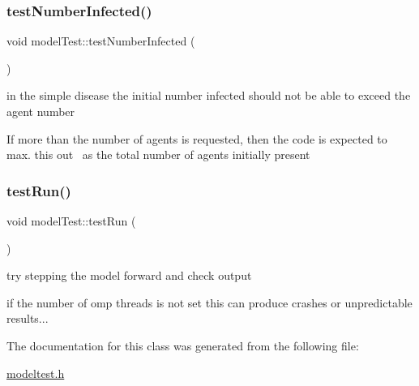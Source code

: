 \subsubsection{\texorpdfstring{test\+Number\+Infected()}{testNumberInfected()}}
{\footnotesize\ttfamily void model\+Test\+::test\+Number\+Infected (\begin{DoxyParamCaption}{ }\end{DoxyParamCaption})\hspace{0.3cm}{\ttfamily [inline]}}



in the simple disease the initial number infected should not be able to exceed the agent number 

If more than the number of agents is requested, then the code is expected to max. this out~\newline
as the total number of agents initially present \mbox{\label{classmodelTest_a18ccf91ea0223e52d439fa267665d718}} 
\subsubsection{\texorpdfstring{test\+Run()}{testRun()}}
{\footnotesize\ttfamily void model\+Test\+::test\+Run (\begin{DoxyParamCaption}{ }\end{DoxyParamCaption})\hspace{0.3cm}{\ttfamily [inline]}}



try stepping the model forward and check output 

if the number of omp threads is not set this can produce crashes or unpredictable results... 

The documentation for this class was generated from the following file\+:\begin{DoxyCompactItemize}
\item 
\mbox{\hyperlink{modeltest_8h}{modeltest.\+h}}\end{DoxyCompactItemize}
